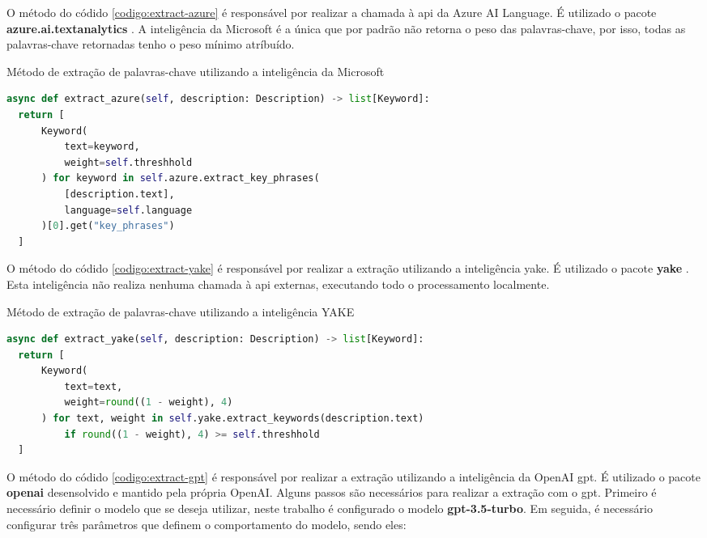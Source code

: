 O método do códido \ref{codigo:extract-azure} é responsável por realizar a chamada à \gls{api} da Azure AI Language. É utilizado o pacote \textbf{azure.ai.textanalytics} \cite{Alcarlucci2023}. A inteligência da Microsoft é a única que por padrão não retorna o peso das palavras-chave, por isso, todas as palavras-chave retornadas tenho o peso mínimo atríbuído.

\begin{sourcecode}[H]
  \caption{\label{codigo:extract-azure}Método de extração de palavras-chave utilizando a inteligência da Microsoft}
  \begin{lstlisting}[frame=single, language=Python]
async def extract_azure(self, description: Description) -> list[Keyword]:
  return [
      Keyword(
          text=keyword, 
          weight=self.threshhold
      ) for keyword in self.azure.extract_key_phrases(
          [description.text], 
          language=self.language
      )[0].get("key_phrases")
  ]
\end{lstlisting}
  \fonte{}
\end{sourcecode}

O método do códido \ref{codigo:extract-yake} é responsável por realizar a extração utilizando a inteligência \gls{yake}. É utilizado o pacote \textbf{yake} \cite{LiaadYake2023}. Esta inteligência não realiza nenhuma chamada à \gls{api} externas, executando todo o processamento localmente.

\begin{sourcecode}[H]
  \caption{\label{codigo:extract-yake}Método de extração de palavras-chave utilizando a inteligência YAKE}
  \begin{lstlisting}[frame=single, language=Python]
async def extract_yake(self, description: Description) -> list[Keyword]:
  return [
      Keyword(
          text=text, 
          weight=round((1 - weight), 4)
      ) for text, weight in self.yake.extract_keywords(description.text)
          if round((1 - weight), 4) >= self.threshhold
  ]
\end{lstlisting}
  \fonte{}
\end{sourcecode}

O método do códido \ref{codigo:extract-gpt} é responsável por realizar a extração utilizando a inteligência da OpenAI \gls{gpt}. É utilizado o pacote \textbf{openai} desensolvido e mantido pela própria OpenAI. Alguns passos são necessários para realizar a extração com o \gls{gpt}. Primeiro é necessário definir o modelo que se deseja utilizar, neste trabalho é configurado o modelo \textbf{gpt-3.5-turbo}. Em seguida, é necessário configurar três parâmetros que definem o comportamento do modelo, sendo eles:


